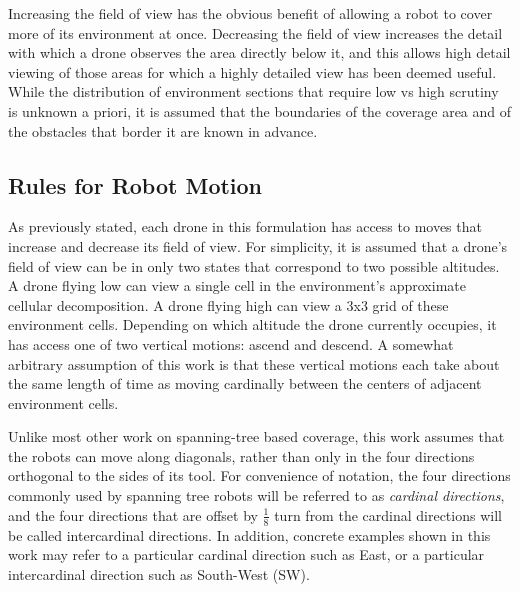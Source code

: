 Increasing the field of view has the obvious benefit of allowing a robot to cover more of its environment at once. Decreasing the field of view increases the detail with which a drone observes the area directly below it, and this allows high detail viewing of those areas for which a highly detailed view has been deemed useful. While the distribution of environment sections that require low vs high scrutiny is unknown a priori, it is assumed that the boundaries of the coverage area and of the obstacles that border it are known in advance.


\subsection{Rules for Robot Motion}

As previously stated, each drone in this formulation has access to moves that increase and decrease its field of view. For simplicity, it is assumed that a drone's field of view can be in only two states that correspond to two possible altitudes. A drone flying low can view a single cell in the environment's approximate cellular decomposition. A drone flying high can view a 3x3 grid of these environment cells. Depending on which altitude the drone currently occupies, it has access one of two vertical motions: ascend and descend. A somewhat arbitrary assumption of this work is that these vertical motions each take about the same length of time as moving cardinally between the centers of adjacent environment cells.

Unlike most other work on spanning-tree based coverage, this work assumes that the robots can move along diagonals, rather than only in the four directions orthogonal to the sides of its tool. For convenience of notation, the four directions commonly used by spanning tree robots will be referred to as \textit{cardinal directions}, and the four directions that are offset by $\frac{1}{8}$ turn from the cardinal directions will be called intercardinal directions. In addition, concrete examples shown in this work may refer to a particular cardinal direction such as East, or a particular intercardinal direction such as South-West (SW).

